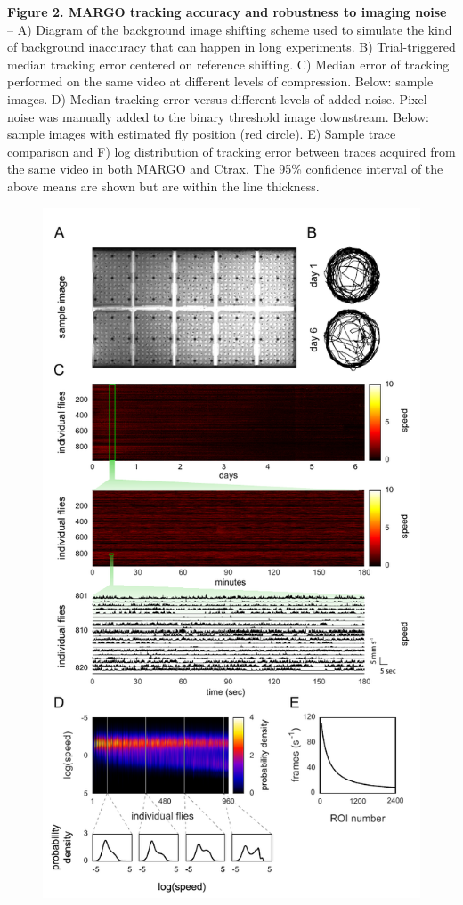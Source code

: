 \documentclass[10pt,letterpaper]{article}
\begin{document}
\clearpage
\textbf{Figure 2. MARGO tracking accuracy and robustness to imaging noise} -- A) Diagram of the background image shifting scheme used to simulate the kind of background inaccuracy that can happen in long experiments. B) Trial-triggered median tracking error centered on reference shifting. C) Median error of tracking performed on the same video at different levels of compression. Below: sample images. D) Median tracking error versus different levels of added noise. Pixel noise was manually added to the binary threshold image downstream. Below: sample images with estimated fly position (red circle). E) Sample trace comparison and F) log distribution of tracking error between traces acquired from the same video in both MARGO and Ctrax. The 95\% confidence interval of the above means are shown but are within the line thickness.

\clearpage
\begin{figure}
	\includegraphics[width=.9\linewidth]{../../figures/960_fly_imaging_panel_sm.pdf}
\end{figure}
\end{document}
